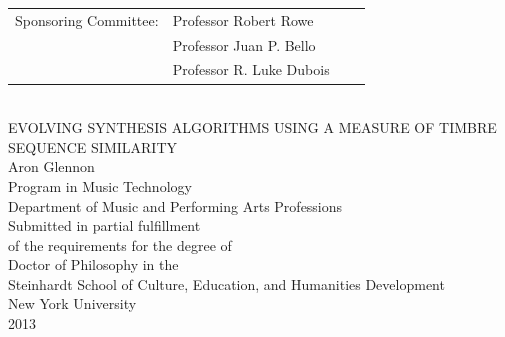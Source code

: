 \documentclass[a4paper,12pt]{report} 	%
\numberwithin{figure}{chapter}
\numberwithin{table}{chapter}
\numberwithin{equation}{chapter}
\begin{document}
\begin{titlepage}
\begin{center}
\begin{tabular}{llll}
  Sponsoring Committee: & Professor Robert Rowe\\
  & Professor Juan P. Bello\\
  & Professor R. Luke Dubois\\
\end{tabular}
\\
\vfill
EVOLVING SYNTHESIS ALGORITHMS USING A MEASURE OF TIMBRE SEQUENCE SIMILARITY\\
\vfill
Aron Glennon\\
Program in Music Technology\\
Department of Music and Performing Arts Professions\\
\vfill
Submitted in partial fulfillment\\
of the requirements for the degree of\\
Doctor of Philosophy in the\\
Steinhardt School of Culture, Education, and Humanities Development\\
New York University\\
2013\\
\end{center}
\end{titlepage}

\newpage
\end{document}
